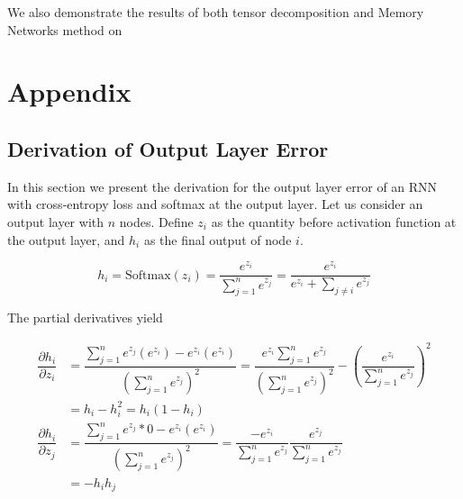 \documentclass[pageno]{final_paper}
\begin{document}
We also demonstrate the results of both tensor decomposition and Memory Networks
method on 

\newpage
{}


\newpage

\section{Appendix}
\label{Appendix}

\subsection{Derivation of Output Layer Error}
\label{Derivation of Output Layer Error}

In this section we present the derivation for the output layer error of an RNN
with cross-entropy loss and softmax at the output layer. Let us consider an
output layer with $n$ nodes. Define $z_i$ as the quantity before activation
function at the output layer, and $h_i$ as the final output of node $i$.

\begin{equation}
    \label{eq: output layer value}
    h_i = \text{Softmax}(z_i) = \dfrac{e^{z_i}}{\sum\limits_{j=1}^n e^{z_j}} = \dfrac{e^{z_i}}
    {e^{z_i} + \sum\limits_{j\neq i} e^{z_j}}
\end{equation}

The partial derivatives yield

\begin{equation}
    \label{eq: output partials}
    \begin{aligned}
        \dfrac{\partial h_i}{\partial z_i} &= \dfrac{\sum\limits_{j=1}^n e^{z_j}(e^{z_i}) - e^{z_i}(e^{z_i})}
        {\left( \sum\limits_{j=1}^n e^{z_j} \right)^2}
        = \dfrac{e^{z_i}\sum\limits_{j=1}^n e^{z_j}}{\left( \sum\limits_{j=1}^n e^{z_j} \right)^2}
        - \left( \dfrac{e^{z_i}}{ \sum\limits_{j=1}^n e^{z_j} } \right)^2 \\
        &= h_i - h_i^2
        = h_i\left( 1 - h_i \right) \\
        \dfrac{\partial h_i}{\partial z_j} &= \dfrac{\sum\limits_{j=1}^n e^{z_j}*0 - e^{z_i}(e^{z_i})}
        {\left( \sum\limits_{j=1}^n e^{z_j} \right)^2}
        = \dfrac{-e^{z_i}}{\sum\limits_{j=1}^n e^{z_j}}\dfrac{e^{z_j}}{\sum\limits_{j=1}^n e^{z_j}} \\
        &= -h_ih_j
    \end{aligned}
\end{equation}
\end{document}
